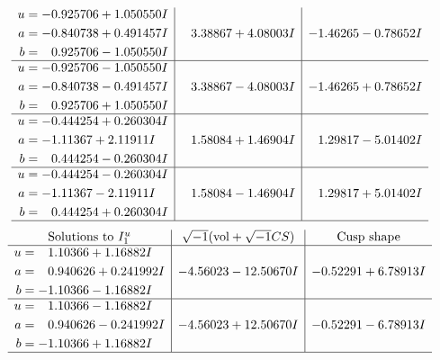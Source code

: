 \documentclass[1p]{elsarticle_modified}
\theoremstyle{definition}
\newcommand{\I}{\sqrt{-1}}
\begin{document}
$$\begin{array}{c|c|c}
\begin{aligned}
u &= -0.925706 + 1.050550 I \\
a &= -0.840738 + 0.491457 I \\
b &= \phantom{-}0.925706 - 1.050550 I\end{aligned}
 & \phantom{-}3.38867 + 4.08003 I & -1.46265 - 0.78652 I \\ \hline\begin{aligned}
u &= -0.925706 - 1.050550 I \\
a &= -0.840738 - 0.491457 I \\
b &= \phantom{-}0.925706 + 1.050550 I\end{aligned}
 & \phantom{-}3.38867 - 4.08003 I & -1.46265 + 0.78652 I \\ \hline\begin{aligned}
u &= -0.444254 + 0.260304 I \\
a &= -1.11367 + 2.11911 I \\
b &= \phantom{-}0.444254 - 0.260304 I\end{aligned}
 & \phantom{-}1.58084 + 1.46904 I & \phantom{-}1.29817 - 5.01402 I \\ \hline\begin{aligned}
u &= -0.444254 - 0.260304 I \\
a &= -1.11367 - 2.11911 I \\
b &= \phantom{-}0.444254 + 0.260304 I\end{aligned}
 & \phantom{-}1.58084 - 1.46904 I & \phantom{-}1.29817 + 5.01402 I\\
 \hline 
 \end{array}$$\newpage$$\begin{array}{c|c|c}  
\text{Solutions to }I^u_{1}& \I (\text{vol} + \sqrt{-1}CS) & \text{Cusp shape}\\
 \hline 
\begin{aligned}
u &= \phantom{-}1.10366 + 1.16882 I \\
a &= \phantom{-}0.940626 + 0.241992 I \\
b &= -1.10366 - 1.16882 I\end{aligned}
 & -4.56023 - 12.50670 I & -0.52291 + 6.78913 I \\ \hline\begin{aligned}
u &= \phantom{-}1.10366 - 1.16882 I \\
a &= \phantom{-}0.940626 - 0.241992 I \\
b &= -1.10366 + 1.16882 I\end{aligned}
 & -4.56023 + 12.50670 I & -0.52291 - 6.78913 I\\
 \hline 
 \end{array}$$\newpage\newpage\renewcommand{\arraystretch}{1}
\end{document}
